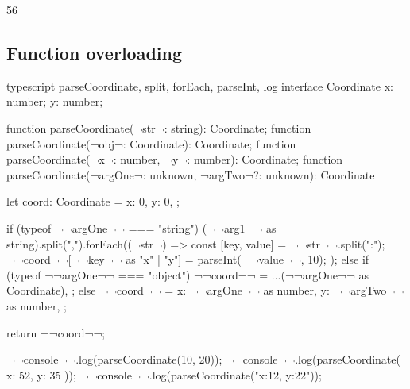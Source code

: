 \begin{console}
    56
\end{console}



\subsection{Function overloading}

\begin{monokai}{typescript}{
        parseCoordinate,
        split,
        forEach,
        parseInt,
        log
    }
    interface Coordinate {
        x: number;
        y: number;
    }
    
    function parseCoordinate(¬str¬: string): Coordinate;
    function parseCoordinate(¬obj¬: Coordinate): Coordinate;
    function parseCoordinate(¬x¬: number, ¬y¬: number): Coordinate;
    function parseCoordinate(¬argOne¬: unknown, ¬argTwo¬?: unknown): Coordinate {
        let coord: Coordinate = {
            x: 0,
            y: 0,
        };
        
        if (typeof ¬¬argOne¬¬ === "string") {
            (¬¬arg1¬¬ as string).split(",").forEach((¬str¬) => {
                const [key, value] = ¬¬str¬¬.split(":");
                ¬¬coord¬¬[¬¬key¬¬ as "x" | "y"] = parseInt(¬¬value¬¬, 10);
            });
        } else if (typeof ¬¬argOne¬¬ === "object") {
            ¬¬coord¬¬ = {
                ...(¬¬argOne¬¬ as Coordinate),
            };
        } else {
            ¬¬coord¬¬ = {
                x: ¬¬argOne¬¬ as number,
                y: ¬¬argTwo¬¬ as number,
            };
        }
        
        return ¬¬coord¬¬;
    }
    
    ¬¬console¬¬.log(parseCoordinate(10, 20));
    ¬¬console¬¬.log(parseCoordinate({ x: 52, y: 35 }));
    ¬¬console¬¬.log(parseCoordinate("x:12, y:22"));
\end{monokai}











































